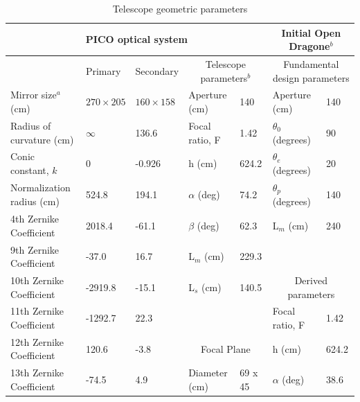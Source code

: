 \documentclass[]{spie}  %
\begin{document}
\begin{table}[ht]
\centering
\caption{Telescope geometric parameters  \label{tab:optics}}

\begin{adjustbox}{width=1.05\textwidth}
\hspace{-1cm}
\begin{tabular}{|l|llll||ll|}
\hline
\multicolumn{5}{|c||}{PICO optical system}                                    & \multicolumn{2}{c|}{Initial Open Dragone$^b$}     \\ \hline
                          & Primary           & Secondary    & \multicolumn{2}{c||}{Telescope parameters$^b$} & \multicolumn{2}{c|}{Fundamental design parameters}  \\
Mirror size$^a$ (cm)      & $270 \times 205$ & $160 \times 158$ & Aperture (cm)           & 140      & Aperture (cm)                  & 140   \\
Radius of curvature (cm)  & $\infty$         & 136.6             & Focal ratio, F             & 1.42     & $\theta_0$ (degrees)           & 90    \\
Conic constant, $k$       & 0                 & -0.926            & h (cm)                    & 624.2    & $\theta_e$ (degrees)           & 20    \\
Normalization radius (cm) & 524.8             & 194.1             & $\alpha$ (deg)            & 74.2     & $\theta_p$ (degrees)           & 140   \\
4th Zernike Coefficient   & 2018.4            & -61.1             & $\beta$  (deg)            &  62.3    & L$_m$ (cm)                     & 240   \\
9th Zernike Coefficient   & -37.0             & 16.7              & L$_m$ (cm)                &   229.3  &                                &         \\
10th Zernike Coefficient  & -2919.8           & -15.1             & L$_s$ (cm)                &   140.5  & \multicolumn{2}{c|}{Derived parameters} \\ 
11th Zernike Coefficient  & -1292.7           & 22.3              &                           &          & Focal ratio, F                 & 1.42  \\   
12th Zernike Coefficient  & 120.6             & -3.8              &   \multicolumn{2}{c||}{Focal Plane}  & h (cm)                         & 624.2 \\   
13th Zernike Coefficient  & -74.5             & 4.9               & Diameter (cm)             & 69 x 45  & $\alpha$ (deg)                 & 38.6  \\   

\end{tabular}
\end{adjustbox}
\end{table}
\end{document}
